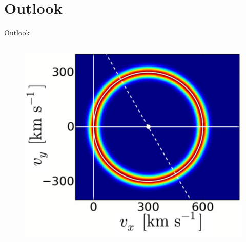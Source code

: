 \documentclass{beamer}
\begin{document}
\section{Outlook}
\begin{frame}{Outlook}
\begin{columns}
	\column{2.5cm}
		\begin{figure}
			\includegraphics[scale=0.15]{pictures/pa.png}
		\end{figure}
	\column{1cm}
	\vspace{1cm}
		\hspace{2.5cm}

\end{columns}
\end{frame}
\end{document}
